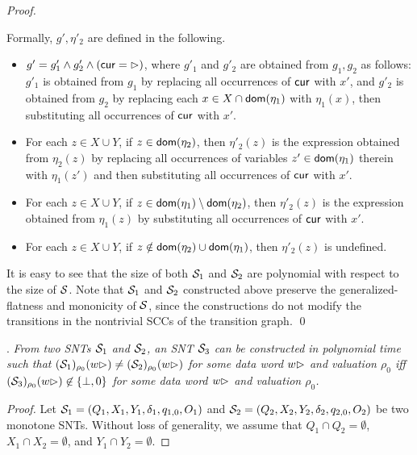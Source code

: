 \begin{appendix}
\begin{proof}
\begin{itemize}
\begin{itemize}
	Formally, $g',\eta'_2$ are defined in the following. 
		\begin{itemize}
		\item $g' = g'_1 \wedge g'_2 \wedge(\mathsf{cur}=\rhd)$, where $g'_1$ and $g'_2$ are obtained from $g_1,g_2$ as follows: $g'_1$ is obtained from $g_1$ by replacing all occurrences of $\mathsf{cur}$ with $x'$, and $g'_2$ is obtained from $g_2$ by replacing each $x \in X\cap \mathsf{dom}(\eta_1)$ with $\eta_1(x)$, then substituting all occurrences of $\mathsf{cur}$ with $x'$.
		\item For each $z \in X\cup Y$, if $z \in \mathsf{dom}(\eta_2)$, then $\eta'_2(z)$ is the expression obtained from $\eta_2(z)$ by replacing all occurrences of variables $z' \in \mathsf{dom}(\eta_1)$ therein with $\eta_1(z')$ and then substituting all occurrences of $\mathsf{cur}$ with $x'$. 
		\item For each $z \in X\cup Y$, if $z \in \mathsf{dom}(\eta_1) \setminus \mathsf{dom}(\eta_2)$, then $\eta'_2(z)$ is the expression obtained from $\eta_1(z)$ by substituting all occurrences of $\mathsf{cur}$ with $x'$.
		\item For each $z \in X\cup Y$, if $z \notin \mathsf{dom}(\eta_2) \cup \mathsf{dom}(\eta_1)$, then $\eta'_2(z)$ is undefined.

		\end{itemize}
	\end{itemize}
\end{itemize}

It is easy to see that the size of both ${\mathcal{S} }_1$ and ${\mathcal{S} }_2$ are polynomial with respect to the size of ${\mathcal{S} }$.
Note that ${\mathcal{S} }_1$ and ${\mathcal{S} }_2$ constructed above preserve the generalized-flatness and mononicity of ${\mathcal{S} }$, since the constructions do not modify the transitions in the nontrivial SCCs of the transition graph.
\qed
\end{proof}


.
\emph{From two SNTs ${\mathcal{S} }_1$ and ${\mathcal{S} }_2$, an SNT ${\mathcal{S} }_3$ can be constructed in polynomial time such that  $({\mathcal{S} }_1)_{\rho_0}(w\rhd) \neq ({\mathcal{S} }_2)_{\rho_0}(w\rhd)$ for some  data word $w \rhd$ and valuation $\rho_0$  iff $({\mathcal{S} }_3)_{\rho_0}(w\rhd) \not\in \{\bot,0\}$ for some data word $w\rhd$ and valuation $\rho_0$.}

\begin{proof}
Let ${\mathcal{S} }_1 = (Q_1,X_1,Y_1,\delta_1,q_{1,0}, O_1)$ and  ${\mathcal{S} }_2 = (Q_2,X_2,Y_2,\delta_2,q_{2,0}, O_2)$ be two monotone SNTs. Without loss of generality, we assume that $Q_1 \cap Q_2 = \emptyset$, $X_1 \cap X_2 = \emptyset$, and $Y_1 \cap Y_2 = \emptyset$. 


\end{proof}
\end{appendix}

